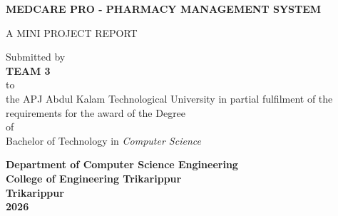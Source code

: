 \documentclass[12pt, a4paper]{report}
\begin{document}
\begin{titlepage}
    \begin{center}
        \vspace*{1cm}
        
        \Large{\textbf{MEDCARE PRO - PHARMACY MANAGEMENT SYSTEM}} \\
        \vspace{1.5cm}
        
        \normalsize{A MINI PROJECT REPORT} \\
        \vspace{1cm}
        
        \normalsize{Submitted by} \\
        \vspace{0.5cm}
        \textbf{TEAM 3} \\
        
        \vspace{2cm}
        \normalsize{to} \\
        \vspace{0.5cm}
        \normalsize{the APJ Abdul Kalam Technological University in partial fulfilment of the requirements for the award of the Degree} \\
        \vspace{0.5cm}
        \normalsize{of} \\
        \vspace{0.5cm}
        \normalsize{Bachelor of Technology in \textit{Computer Science}} \\
        
        \vfill
        
        \textbf{Department of Computer Science Engineering} \\
        \textbf{College of Engineering Trikarippur} \\
        \textbf{Trikarippur} \\
        \vspace{0.5cm}
        \textbf{2026}
        
    \end{center}
\end{titlepage}

\end{document}
